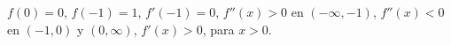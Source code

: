 \item $f(0) = 0$, $f(-1) = 1$, $f'(-1) = 0$, $f''(x) > 0$ en $(-\infty, -1)$, $f''(x) < 0$ en $(-1, 0)$ y $(0, \infty)$, $f'(x) > 0$, para $x > 0$.
